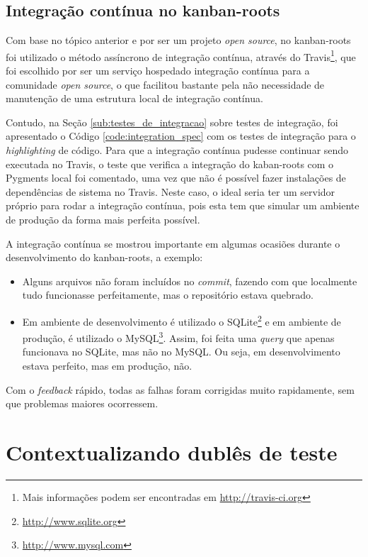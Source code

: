 \subsection{Integração contínua no kanban-roots}
\label{sub:integracao_continua_no_kanban}

Com base no tópico anterior e por ser um projeto \textit{open source}, no kanban-roots foi utilizado o método assíncrono de integração contínua, através do Travis\footnote{Mais informações podem ser encontradas em \url{http://travis-ci.org}}, que foi escolhido por ser um serviço hospedado integração contínua para a comunidade \textit{open source}, o que facilitou bastante pela não necessidade de manutenção de uma estrutura local de integração contínua.

Contudo, na Seção \ref{sub:testes_de_integracao} sobre testes de integração, foi apresentado o Código \ref{code:integration_spec} com os testes de integração para o \textit{highlighting} de código. Para que a integração contínua pudesse continuar sendo executada no Travis, o teste que verifica a integração do kaban-roots com o Pygments local foi comentado, uma vez que não é possível fazer instalações de dependências de sistema no Travis. Neste caso, o ideal seria ter um servidor próprio para rodar a integração contínua, pois esta tem que simular um ambiente de produção da forma mais perfeita possível.

A integração contínua se mostrou importante em algumas ocasiões durante o desenvolvimento do kanban-roots, a exemplo:

\begin{itemize}
  \item Alguns arquivos não foram incluídos no \textit{commit}, fazendo com que localmente tudo funcionasse perfeitamente, mas o repositório estava quebrado.
  \item Em ambiente de desenvolvimento é utilizado o SQLite\footnote{\url{http://www.sqlite.org}} e em ambiente de produção, é utilizado o MySQL\footnote{\url{http://www.mysql.com}}. Assim, foi feita uma \textit{query} que apenas funcionava no SQLite, mas não no MySQL. Ou seja, em desenvolvimento estava perfeito, mas em produção, não.
\end{itemize}

Com o \textit{feedback} rápido, todas as falhas foram corrigidas muito rapidamente, sem que problemas maiores ocorressem.


\section{Contextualizando dublês de teste}

